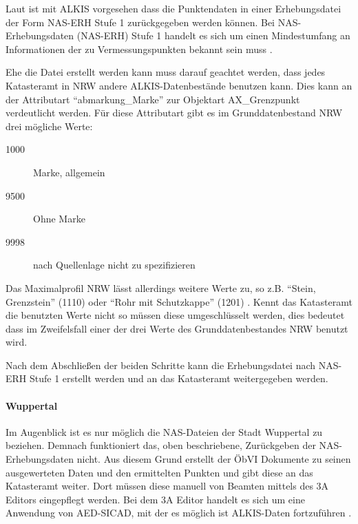 Laut \autocite{jungemann-alltag} ist mit ALKIS vorgesehen dass die Punktendaten in einer Erhebungsdatei der Form NAS-ERH Stufe 1 zurückgegeben werden können.
Bei NAS-Erhebungsdaten (NAS-ERH) Stufe 1 handelt es sich um einen Mindestumfang an Informationen der zu Vermessungspunkten bekannt sein muss \autocite[vgl.][]{bezk-nas-erh}.

Ehe die Datei erstellt werden kann muss darauf geachtet werden, dass jedes Katasteramt in \ac{NRW} andere ALKIS-Datenbestände benutzen kann. Dies kann an der Attributart "`abmarkung\_Marke"' zur Objektart AX\_Grenzpunkt verdeutlicht werden. Für diese Attributart gibt es im  Grunddatenbestand NRW drei mögliche Werte:
\begin{description}
\item[1000] Marke, allgemein
\item[9500] Ohne Marke
\item[9998] nach Quellenlage nicht zu spezifizieren 
\end{description}
Das Maximalprofil NRW lässt allerdings weitere Werte zu, so z.B. "`Stein, Grenzstein"' (1110) oder "`Rohr mit Schutzkappe"' (1201) \autocite[vgl.][]{bezk-schluessel}. Kennt das Katasteramt die benutzten Werte nicht so müssen diese umgeschlüsselt werden, dies bedeutet dass im Zweifelsfall einer der drei Werte des Grunddatenbestandes NRW benutzt wird. 


Nach dem Abschließen der beiden Schritte kann die Erhebungsdatei nach NAS-ERH Stufe 1  erstellt werden und an das Katasteramt weitergegeben werden. 

\paragraph{Wuppertal}
Im Augenblick ist es nur möglich die NAS-Dateien der Stadt Wuppertal zu beziehen. Demnach funktioniert das, oben beschriebene, Zurückgeben der NAS-Erhebungsdaten nicht. Aus diesem Grund erstellt der \ac{ÖbVI} Dokumente zu seinen ausgewerteten Daten und den ermittelten Punkten und gibt diese an das Katasteramt weiter. Dort müssen diese manuell von Beamten mittels des 3A Editors eingepflegt werden. Bei dem 3A Editor handelt es sich um eine Anwendung von AED-SICAD, mit der es möglich ist ALKIS-Daten fortzuführen \autocite[vgl.][]{sicad-3a}.


